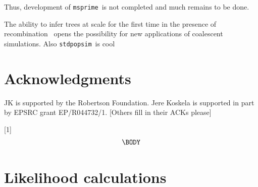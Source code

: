 \documentclass{article}
\newcommand{\msprime}[0]{\texttt{msprime}}
\newcommand{\stdpopsim}[0]{\texttt{stdpopsim}}
\begin{document}
Thus, development of \msprime\ is not completed and much remains
to be done.


The ability to infer trees at scale for the first time
in the presence of
recombination~\citep{harris2019database,kelleher2019inferring,
speidel2019method,tang2019genealogy}
opens the possibility for new applications of coalescent simulations.
Also \stdpopsim\ is cool~\citep{adrion2020community}

\section*{Acknowledgments}
JK is supported by the Robertson Foundation.
Jere Koskela is supported in part by EPSRC grant EP/R044732/1.
[Others fill in their ACKs please]





 \newcommand{\be}{\begin{equation}}
 \newcommand{\ee}{\end{equation}}
 \newcommand{\bd}{\begin{displaymath}}
 \newcommand{\ed}{\end{displaymath}}
\newcommand{\IN}{\ensuremath{\mathds{N}}}%
\newcommand{\EE}[1]{\ensuremath{\mathds{E}\left[ #1 \right]}}%
\newcommand{\one}[1]{\ensuremath{\mathds{1}_{\left\{ #1 \right\}}}}%
\newcommand{\prb}[1]{\ensuremath{\mathds{P}\left( #1 \right) } }%

[1]{%
\begin{equation}
\label{#1}
\begin{split}
  \BODY
\end{split}\end{equation}
}

\appendix

\label{app-likelihoods}
\section{Likelihood calculations}
\end{document}
